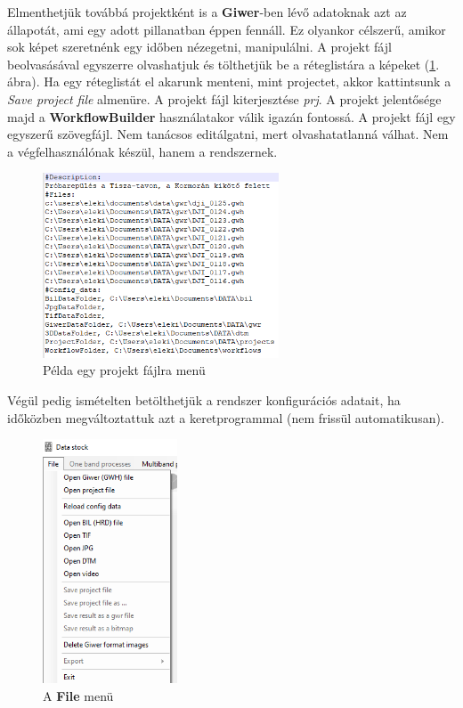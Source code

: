 \documentclass[a4paper,12pt]{book}
\begin{document}
Elmenthetjük továbbá projektként is a \textbf{Giwer}-ben lévő adatoknak azt az állapotát, ami egy adott pillanatban éppen fennáll. Ez olyankor célszerű, amikor sok képet szeretnénk egy időben nézegetni, manipulálni. A projekt fájl beolvasásával egyszerre olvashatjuk és tölthetjük be a réteglistára a képeket (\ref{fig:projectfile}. ábra). Ha egy réteglistát el akarunk menteni, mint projectet, akkor kattintsunk a \textit{Save project file} almenüre. A projekt fájl kiterjesztése \textit{prj}. A projekt jelentősége majd a \textbf{WorkflowBuilder} használatakor válik igazán fontossá. A projekt fájl egy egyszerű szövegfájl. Nem tanácsos editálgatni, mert olvashatatlanná válhat. Nem a végfelhasználónak készül, hanem a rendszernek.

\begin{figure}[h]
	\centering
	\includegraphics[width=7cm]{project_file}
	\caption{Példa egy projekt fájlra menü}
	\label{fig:projectfile}
\end{figure}

Végül pedig ismételten betölthetjük a rendszer konfigurációs adatait, ha időközben megváltoztattuk azt a keretprogrammal (nem frissül automatikusan).

\begin{figure}
	\centering
	\includegraphics[width=4cm]{filemenu_datastock.png}
	\caption{A \textbf{File} menü}
	\label{fig:filemenu_datastock}
\end{figure}
\end{document}
